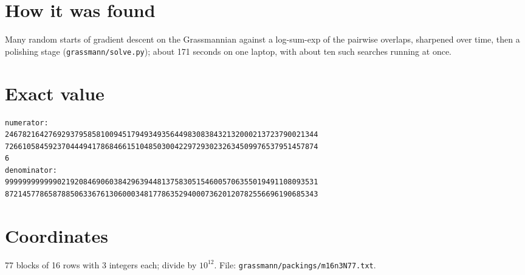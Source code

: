 \documentclass[11pt,a4paper]{article}
\begin{document}
\section{How it was found}
Many random starts of gradient descent on the Grassmannian against a log-sum-exp of the pairwise overlaps, sharpened over time, then a polishing stage (\texttt{grassmann/solve.py}); about 171 seconds on one laptop, with about ten such searches running at once.


\appendix
\section{Exact value}
{\small
\begin{verbatim}
numerator:
246782164276929379585810094517949349356449830838432132000213723790021344
726610584592370444941786846615104850300422972930232634509976537951457874
6
denominator:
999999999999021920846906038429639448137583051546005706355019491108093531
872145778658788506336761306000348177863529400073620120782556696190685343
\end{verbatim}}

\section{Coordinates}
77 blocks of 16 rows with 3 integers each; divide by $10^{12}$. File: \texttt{grassmann/packings/m16n3N77.txt}.
{\tiny
\begin{multicols}{3}
\end{multicols}}
\end{document}

